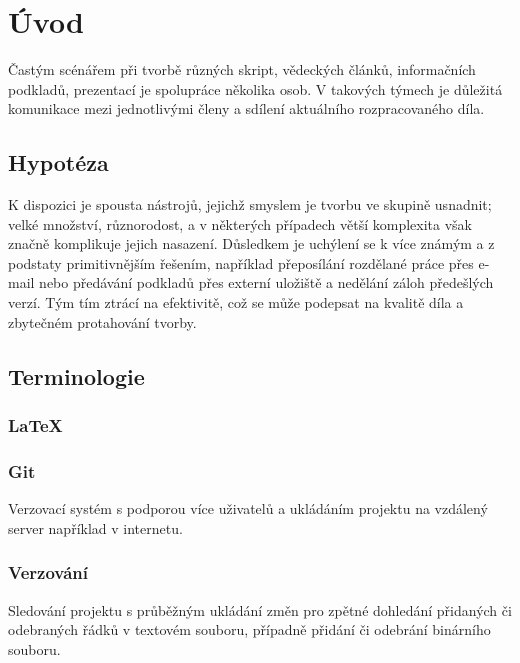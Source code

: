 \chapter{Úvod}
Častým scénářem při tvorbě různých skript, vědeckých článků, informačních podkladů, prezentací je spolupráce několika osob. V takových týmech je důležitá komunikace mezi jednotlivými členy a sdílení aktuálního rozpracovaného díla.

\section{Hypotéza}

K dispozici je spousta nástrojů, jejichž smyslem je tvorbu ve skupině usnadnit; velké množství, různorodost, a v některých případech větší komplexita však značně komplikuje jejich nasazení. Důsledkem je uchýlení se k více známým a z podstaty primitivnějším řešením, například přeposílání rozdělané práce přes e-mail nebo předávání podkladů přes externí uložiště a nedělání záloh předešlých verzí. Tým tím ztrácí na efektivitě, což se může podepsat na kvalitě díla a zbytečném protahování tvorby.

\section{Terminologie}

\subsection{\LaTeX}

 \cite{latex-def}

\subsection{Git}

Verzovací systém s podporou více uživatelů a ukládáním projektu na vzdálený server například v internetu.

\subsection{Verzování}

Sledování projektu s průběžným ukládání změn pro zpětné dohledání přidaných či odebraných řádků v textovém souboru, případně přidání či odebrání binárního souboru.

